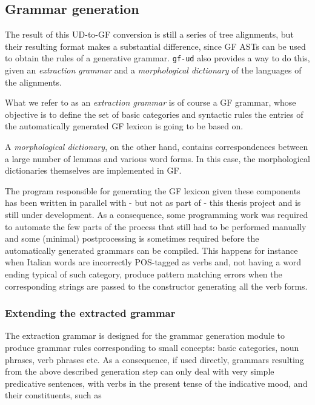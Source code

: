 \subsection{Grammar generation} \label{grgn}
The result of this UD-to-GF conversion is still a series of tree alignments, but their resulting format makes a substantial difference, since GF ASTs can be used to obtain the rules of a generative grammar. \texttt{gf-ud} also provides a way to do this, given an \textit{extraction grammar} and a \textit{morphological dictionary} of the languages of the alignments. \smallskip

What we refer to as an \textit{extraction grammar} is of course a GF grammar, whose objective is to define the set of basic categories and syntactic rules the entries of the automatically generated GF lexicon is going to be based on. \smallskip

A \textit{morphological dictionary}, on the other hand, contains correspondences between a large number of lemmas and various word forms. In this case, the morphological dictionaries themselves are implemented in GF. \smallskip

The program responsible for generating the GF lexicon given these components has been written in parallel with - but not as part of - this thesis project and is still under development. As a consequence, some programming work was required to automate the few parts of the process that still had to be performed manually and some (minimal) postprocessing is sometimes required before the automatically generated grammars can be compiled. This happens for instance when Italian words are incorrectly POS-tagged as verbs and, not having a word ending typical of such category, produce pattern matching errors when the corresponding strings are passed to the constructor generating all the verb forms. \smallskip

\subsubsection{Extending the extracted grammar} \label{extend}
The extraction grammar is designed for the grammar generation module to produce grammar rules corresponding to small concepts: basic categories, noun phrases, verb phrases etc. 
As a consequence, if used directly, grammars resulting from the above described generation step can only deal with very simple predicative sentences, with verbs in the present tense of the indicative mood, and their constituents, such as\smallskip

